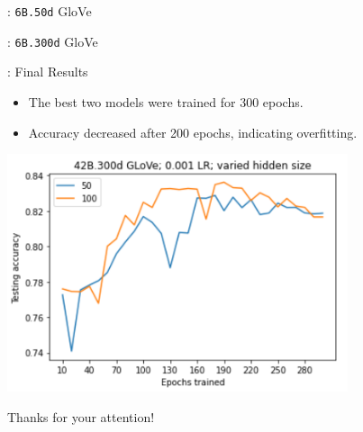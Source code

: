 \documentclass{beamer}
\begin{document}
\begin{frame}{\secname: \texttt{6B.50d} GloVe}

\end{frame}

\begin{frame}{\secname: \texttt{6B.300d} GloVe}

\end{frame}

\begin{frame}{\secname: Final Results}
\begin{itemize}
    \item The best two models were trained for 300 epochs.
    
    \item Accuracy decreased after 200 epochs, indicating overfitting.
\end{itemize}
\centering
\includegraphics[width=0.75\textwidth]{images/exp-round2.png}
%
\end{frame}

\begin{frame}[c]
\begin{minipage}[c][\textheight][c]{\linewidth}
\centering
Thanks for your attention!
\end{minipage}
\end{frame}
\end{document}
